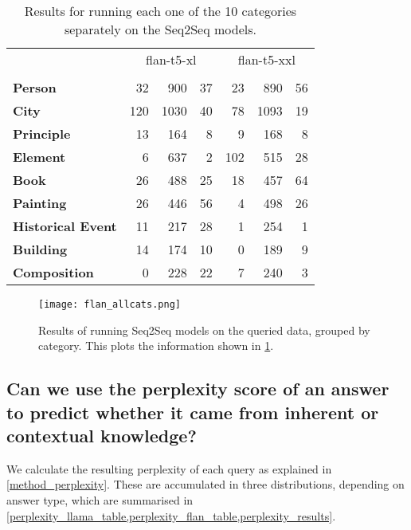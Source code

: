 \begin{table}[ht]
	\centering
	\footnotesize
	\begin{tabular}{>{\bfseries}l | r r r | r r r}
		\toprule
			& \multicolumn{3}{|c}{\ttfamily flan-t5-xl} & \multicolumn{3}{|c}{\ttfamily flan-t5-xxl} \\
			& \Parametric{} & \Contextual{} & \Other{} & \Parametric{} & \Contextual{} & \Other{} \\
		\midrule
			Person           &  32 &  900 & 37 &  23 &  890 & 56 \\
			City             & 120 & 1030 & 40 &  78 & 1093 & 19 \\
			Principle        &  13 &  164 &  8 &   9 &  168 &  8 \\
			Element          &   6 &  637 &  2 & 102 &  515 & 28 \\
			Book             &  26 &  488 & 25 &  18 &  457 & 64 \\
			Painting         &  26 &  446 & 56 &   4 &  498 & 26 \\
			Historical Event &  11 &  217 & 28 &   1 &  254 &  1 \\
			Building         &  14 &  174 & 10 &   0 &  189 &  9 \\
			Composition      &   0 &  228 & 22 &   7 &  240 &  3 \\
		\bottomrule
	\end{tabular}
	\caption{Results for running each one of the 10 categories separately on the Seq2Seq models.}
	\label{flan_cats_table}
\end{table}

\begin{figure}[p]
	\centering
	\texttt{[image: flan\_allcats.png]}
	\caption{Results of running Seq2Seq models on the queried data, grouped by category. This plots the information shown in \cref{flan_cats_table}.}
	\label{flan_cats_result}
\end{figure}

\newpage{}

\subsection{Can we use the perplexity score of an answer to predict whether it came from inherent or contextual knowledge?}
\label{results_perplexity_score}

We calculate the resulting perplexity of each query as explained in \cref{method_perplexity}.
These are accumulated in three distributions, depending on answer type, which are summarised in \cref{perplexity_llama_table,perplexity_flan_table,perplexity_results}.


